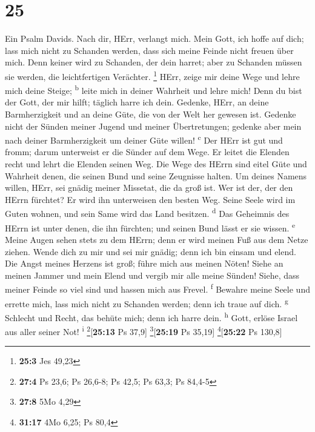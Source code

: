 \hypertarget{section-24}{%
\section{25}\label{section-24}}

 Ein Psalm Davids. Nach dir, HErr, verlangt mich.
 Mein Gott, ich hoffe auf dich; lass mich nicht zu
Schanden werden, dass sich meine Feinde nicht freuen über mich.
 Denn keiner wird zu Schanden, der dein harret; aber zu
Schanden müssen sie werden, die leichtfertigen Verächter. \footnote{\textbf{25:3}
  Jes 49,23}  HErr, zeige mir deine Wege und lehre mich
deine Steige; \textsuperscript{b}  leite mich in deiner
Wahrheit und lehre mich! Denn du bist der Gott, der mir hilft; täglich
harre ich dein.  Gedenke, HErr, an deine Barmherzigkeit
und an deine Güte, die von der Welt her gewesen ist. 
Gedenke nicht der Sünden meiner Jugend und meiner Übertretungen; gedenke
aber mein nach deiner Barmherzigkeit um deiner Güte willen!
\textsuperscript{c}  Der HErr ist gut und fromm; darum
unterweist er die Sünder auf dem Wege.  Er leitet die
Elenden recht und lehrt die Elenden seinen Weg.  Die Wege
des HErrn sind eitel Güte und Wahrheit denen, die seinen Bund und seine
Zeugnisse halten.  Um deines Namens willen, HErr, sei
gnädig meiner Missetat, die da groß ist.  Wer ist der,
der den HErrn fürchtet? Er wird ihn unterweisen den besten Weg.
 Seine Seele wird im Guten wohnen, und sein Same wird das
Land besitzen. \textsuperscript{d}  Das Geheimnis des
HErrn ist unter denen, die ihn fürchten; und seinen Bund lässt er sie
wissen. \textsuperscript{e}  Meine Augen sehen stets zu
dem HErrn; denn er wird meinen Fuß aus dem Netze ziehen. 
Wende dich zu mir und sei mir gnädig; denn ich bin einsam und elend.
 Die Angst meines Herzens ist groß; führe mich aus meinen
Nöten!  Siehe an meinen Jammer und mein Elend und vergib
mir alle meine Sünden!  Siehe, dass meiner Feinde so viel
sind und hassen mich aus Frevel. \textsuperscript{f} 
Bewahre meine Seele und errette mich, lass mich nicht zu Schanden
werden; denn ich traue auf dich. \textsuperscript{g} 
Schlecht und Recht, das behüte mich; denn ich harre dein.
\textsuperscript{h}  Gott, erlöse Israel aus aller seiner
Not! \textsuperscript{i} \footnote{\textbf{27:4} Ps 23,6; Ps 26,6-8; Ps
  42,5; Ps 63,3; Ps 84,4-5}{[}\textbf{25:13} Ps 37,9{]}
\footnote{\textbf{27:8} 5Mo 4,29}{[}\textbf{25:19} Ps 35,19{]}
\footnote{\textbf{31:17} 4Mo 6,25; Ps 80,4}{[}\textbf{25:22} Ps 130,8{]}

